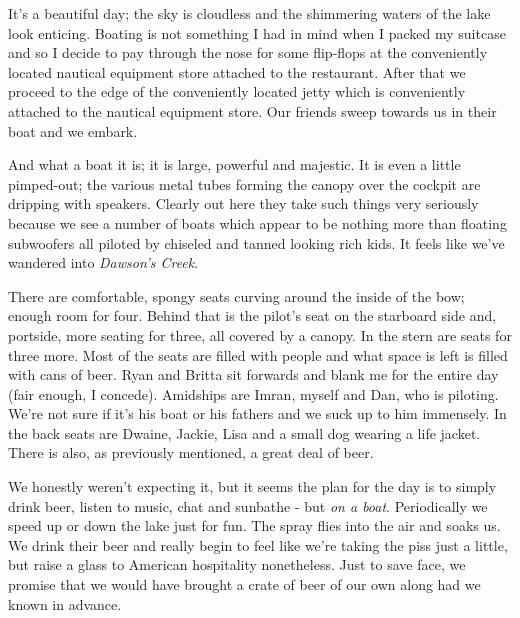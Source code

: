 \documentclass[a5paper,titlepage,11pt]{book}
\begin{document}
It's a beautiful day; the sky is cloudless and the shimmering waters of the lake look enticing.  Boating is not something I had in mind when I packed my suitcase and so I decide to pay through the nose for some flip-flops at the conveniently located nautical equipment store attached to the restaurant.  After that we proceed to the edge of the conveniently located jetty which is conveniently attached to the nautical equipment store.  Our friends sweep towards us in their boat and we embark.


And what a boat it is; it is large, powerful and majestic.  It is even a little pimped-out; the various metal tubes forming the canopy over the cockpit are dripping with speakers.  Clearly out here they take such things very seriously because we see a number of boats which appear to be nothing more than floating subwoofers all piloted by chiseled and tanned looking rich kids.  It feels like we've wandered into \emph{Dawson's Creek}.

There are comfortable, spongy seats curving around the inside of the bow; enough room for four.  Behind that is the pilot's seat on the starboard side and, portside, more seating for three, all covered by a canopy.  In the stern are seats for three more.  Most of the seats are filled with people and what space is left is filled with cans of beer.  Ryan and Britta sit forwards and blank me for the entire day (fair enough, I concede).  Amidships are Imran, myself and Dan, who is piloting.  We're not sure if it's his boat or his fathers and we suck up to him immensely.  In the back seats are Dwaine, Jackie, Lisa and a small dog wearing a life jacket.  There is also, as previously mentioned, a great deal of beer.

We honestly weren't expecting it, but it seems the plan for the day is to simply drink beer, listen to music, chat and sunbathe - but \emph{on a boat}.  Periodically we speed up or down the lake just for fun.  The spray flies into the air and soaks us.  We drink their beer and really begin to feel like we're taking the piss just a little, but raise a glass to American hospitality nonetheless.  Just to save face, we promise that we would have brought a crate of beer of our own along had we known in advance.

\end{document}
